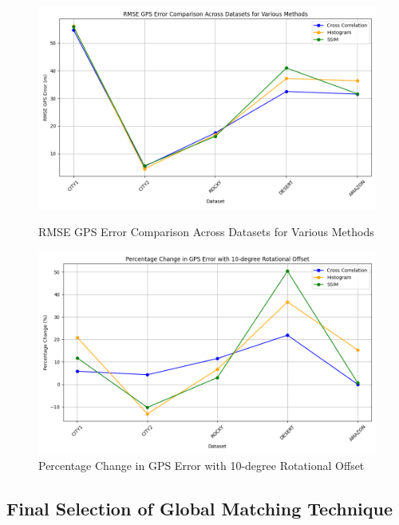 \begin{figure}[H]
    \centering
    \begin{minipage}{0.45\textwidth}
        \centering
        \includegraphics[width=\textwidth]{./Chapter 4/testresults/rmse_comparison_methods.png}
        \caption{RMSE GPS Error Comparison Across Datasets for Various Methods}
        \label{fig:rmse_comparison_methods}
    \end{minipage}\hfill
    \begin{minipage}{0.45\textwidth}
        \centering
        \includegraphics[width=\textwidth]{./Chapter 4/testresults/percentage_change_comparison_methods.png}
        \caption{Percentage Change in GPS Error with 10-degree Rotational Offset}
        \label{fig:percentage_change_comparison_methods}
    \end{minipage}
\end{figure}



\subsection{Final Selection of Global Matching Technique}

